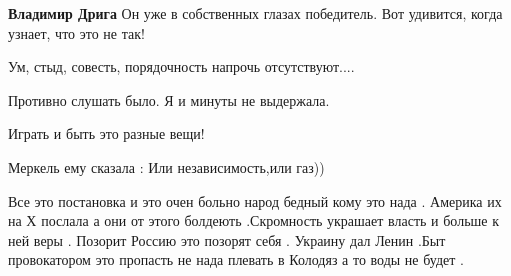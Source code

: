 \begin{itemize}
\begin{itemize}
\textbf{Владимир Дрига} Он уже в собственных глазах победитель. Вот удивится, когда узнает, что это не так!
\end{itemize}

 
Ум, стыд, совесть, порядочность напрочь отсутствуют....

 
Противно слушать было. Я и минуты не выдержала.

 
Играть и быть это разные вещи!

 
Меркель ему сказала :
Или независимость,или газ))

 

Все это постановка и это очен больно народ бедный кому это нада . Америка их на
Х послала а они от этого болдеють .Скромность украшает власть и больше к ней
веры . Позорит Россию это позорят себя . Украину дал Ленин .Быт провокатором
это пропасть не нада плевать в Колодяз а то воды не будет .

\begin{itemize}
 

\end{itemize}
\end{itemize}
